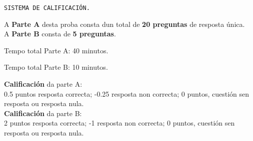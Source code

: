 \begin{instruccions}
    \begin{center}
    \texttt{SISTEMA DE CALIFICACIÓN.}
    \end{center}
    \par
    \vspace*{0.15cm}
    A \textbf{Parte A} desta proba consta dun total de \textbf{20 preguntas} de resposta única.\\
    A \textbf{Parte B} consta de \textbf{5 preguntas}.
    \par
    \vspace*{0.15cm}
    Tempo total Parte A: 40 minutos.
    \par
    Tempo total Parte B: 10 minutos.
    \par
    \vspace*{0.15cm}
    \textbf{Calificación} da parte A: \\
    0.5 puntos resposta correcta; -0.25 resposta non correcta; 0 puntos, cuestión sen resposta ou resposta nula.\\
     \textbf{Calificación} da parte B:\\
     2 puntos resposta correcta; -1 resposta non correcta; 0 puntos, cuestión sen resposta ou resposta nula.
   
\end{instruccions}
%
\newpage
%

